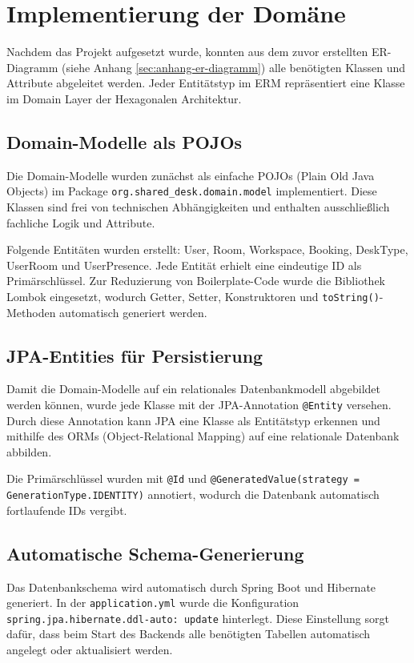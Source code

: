 \documentclass[11pt,a4paper]{report}
\begin{document}
\section{Implementierung der Domäne}

Nachdem das Projekt aufgesetzt wurde, konnten aus dem zuvor erstellten ER-Diagramm (siehe Anhang \ref{sec:anhang-er-diagramm}) alle benötigten Klassen und Attribute abgeleitet werden. Jeder Entitätstyp im ERM repräsentiert eine Klasse im Domain Layer der Hexagonalen Architektur.

\subsection{Domain-Modelle als POJOs}

Die Domain-Modelle wurden zunächst als einfache POJOs (Plain Old Java Objects) im Package \texttt{org.shared\_desk.domain.model} implementiert. Diese Klassen sind frei von technischen Abhängigkeiten und enthalten ausschließlich fachliche Logik und Attribute.

Folgende Entitäten wurden erstellt: User, Room, Workspace, Booking, DeskType, UserRoom und UserPresence. Jede Entität erhielt eine eindeutige ID als Primärschlüssel. Zur Reduzierung von Boilerplate-Code wurde die Bibliothek Lombok eingesetzt, wodurch Getter, Setter, Konstruktoren und \texttt{toString()}-Methoden automatisch generiert werden.

\subsection{JPA-Entities für Persistierung}

Damit die Domain-Modelle auf ein relationales Datenbankmodell abgebildet werden können, wurde jede Klasse mit der JPA-Annotation \texttt{@Entity} versehen. Durch diese Annotation kann JPA eine Klasse als Entitätstyp erkennen und mithilfe des ORMs (Object-Relational Mapping) auf eine relationale Datenbank abbilden.

Die Primärschlüssel wurden mit \texttt{@Id} und \texttt{@GeneratedValue(strategy = GenerationType.IDENTITY)} annotiert, wodurch die Datenbank automatisch fortlaufende IDs vergibt.

\subsection{Automatische Schema-Generierung}

Das Datenbankschema wird automatisch durch Spring Boot und Hibernate generiert. In der \texttt{application.yml} wurde die Konfiguration \texttt{spring.jpa.hibernate.ddl-auto: update} hinterlegt. Diese Einstellung sorgt dafür, dass beim Start des Backends alle benötigten Tabellen automatisch angelegt oder aktualisiert werden.
\end{document}
